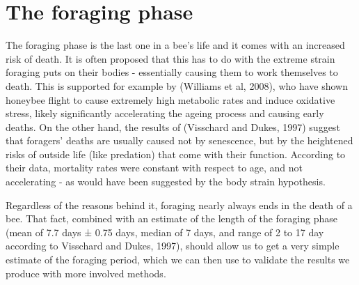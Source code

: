 \section{The foraging phase}
The foraging phase is the last one in a bee’s life and it comes with an increased risk of death. 
It is often proposed that this has to do with the extreme strain foraging puts on their bodies - 
essentially causing them to work themselves to death. This is supported for example by (Williams et al, 2008), 
who have shown honeybee flight to cause extremely high metabolic rates and induce oxidative stress, 
likely significantly accelerating the ageing process and causing early deaths. On the other hand, 
the results of \citep{Aup91} (Visschard and Dukes, 1997) suggest that foragers’ deaths are usually caused not by senescence, 
but by the heightened risks of outside life (like predation) that come with their function. 
According to their \citep{Dou72} data, mortality rates were constant with respect to age, and not accelerating - 
as would have been suggested by the body strain hypothesis. 

Regardless of the reasons behind it, foraging nearly always ends in the death of a bee. 
That fact, combined with an estimate of the length of the foraging phase 
(mean of 7.7 days ± 0.75 days, median of 7 days, and range of 2 to 17 day according to \citep{Aup91} Visschard and Dukes, 1997), 
should allow us to get a very simple estimate of the foraging period, which we can then use to validate the results 
we produce with more involved methods.
